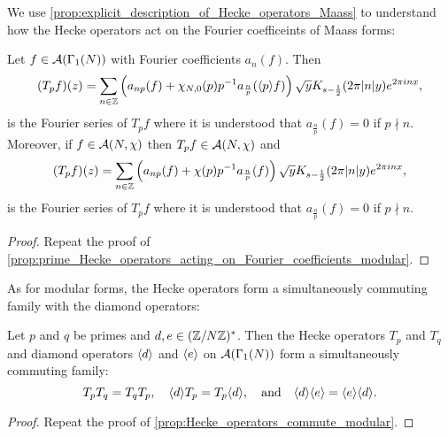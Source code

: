       We use \cref{prop:explicit_description_of_Hecke_operators_Maass} to understand how the Hecke operators act on the Fourier coefficeints of Maass forms:

      \begin{proposition}\label{prop:prime_Hecke_operators_acting_on_Fourier_coefficients_Maass}
        Let $f \in \mathcal{A}(\Gamma_{1}(N))$ with Fourier coefficients $a_{n}(f)$. Then
        \[
          (T_{p}f)(z) = \sum_{n \in \mathbb{Z}}\left(a_{np}(f)+\chi_{N,0}(p)p^{-1}a_{\frac{n}{p}}(\langle p\rangle f)\right)\sqrt{y}K_{s-\frac{1}{2}}(2\pi|n|y)e^{2\pi inx},
        \]
        is the Fourier series of $T_{p}f$ where it is understood that $a_{\frac{n}{p}}(f) = 0$ if $p \nmid n$. Moreover, if $f \in \mathcal{A}(N,\chi)$ then $T_{p}f \in \mathcal{A}(N,\chi)$ and
        \[
          (T_{p}f)(z) = \sum_{n \in \mathbb{Z}}\left(a_{np}(f)+\chi(p)p^{-1}a_{\frac{n}{p}}(f)\right)\sqrt{y}K_{s-\frac{1}{2}}(2\pi|n|y)e^{2\pi inx},
        \]
        is the Fourier series of $T_{p}f$ where it is understood that $a_{\frac{n}{p}}(f) = 0$ if $p \nmid n$.
      \end{proposition}
      \begin{proof}
        Repeat the proof of \cref{prop:prime_Hecke_operators_acting_on_Fourier_coefficients_modular}.
      \end{proof}

      As for modular forms, the Hecke operators form a simultaneously commuting family with the diamond operators:

      \begin{proposition}\label{prop:Hecke_operators_commute_Maass}
        Let $p$ and $q$ be primes and $d,e \in (\mathbb{Z}/N\mathbb{Z})^{\ast}$. Then the Hecke operators $T_{p}$ and $T_{q}$ and diamond operators $\langle d\rangle$ and $\langle e\rangle$ on $\mathcal{A}(\Gamma_{1}(N))$ form a simultaneously commuting family:
        \[
          T_{p}T_{q} = T_{q}T_{p}, \quad \langle d\rangle T_{p} = T_{p}\langle d\rangle, \quad \text{and} \quad \langle d\rangle\langle e\rangle = \langle e\rangle\langle d\rangle.
        \]
      \end{proposition}
      \begin{proof}
        Repeat the proof of \cref{prop:Hecke_operators_commute_modular}.
      \end{proof}

